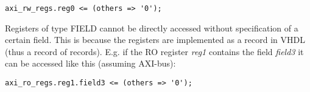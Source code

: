 \documentclass{article}
\begin{document}
\begin{lstlisting}[style=vhdl]
axi_rw_regs.reg0 <= (others => '0');
\end{lstlisting}

\par Registers of type FIELD cannot be directly accessed without specification of a certain field. This is because the registers are implemented as a record in VHDL (thus a record of records). E.g. if the RO register \textit{reg1} contains the field \textit{field3} it can be accessed like this (assuming AXI-bus):

\begin{lstlisting}[style=vhdl]
axi_ro_regs.reg1.field3 <= (others => '0');
\end{lstlisting}
\end{document}
